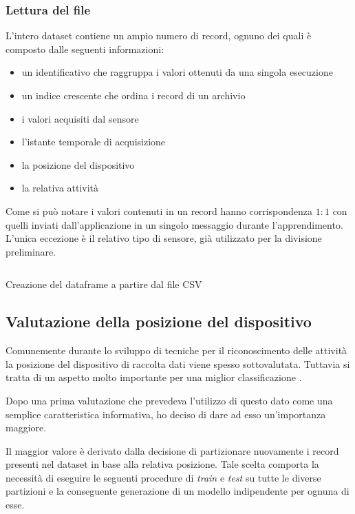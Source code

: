 \subsubsection{Lettura del file}
L'intero dataset contiene un ampio numero di record, ognuno dei quali è composto dalle seguenti informazioni:
\begin{itemize}
    \item un identificativo che raggruppa i valori ottenuti da una singola esecuzione
    \item un indice crescente che ordina i record di un archivio
    \item i valori acquisiti dal sensore
    \item l'istante temporale di acquisizione
    \item la posizione del dispositivo
    \item la relativa attività
\end{itemize}
Come si può notare i valori contenuti in un record hanno corrispondenza $1:1$ con quelli 
inviati dall'applicazione in un singolo messaggio durante l'apprendimento. L'unica eccezione è 
il relativo tipo di sensore, già utilizzato per la divisione preliminare.

\begin{listing}[H] 
    \inputminted[frame=single,framesep=10pt]{python}{assets/snippets/classifier/read_csv.py}
    \caption{Creazione del dataframe a partire dal file CSV}
\end{listing}


\subsection{Valutazione della posizione del dispositivo}
Comunemente durante lo sviluppo di tecniche per il riconoscimento delle attività la posizione del dispositivo di 
raccolta dati viene spesso sottovalutata. Tuttavia si tratta di un aspetto molto importante per 
una miglior classificazione \cite{umafall}.

\vspace{5mm} %

Dopo una prima valutazione che prevedeva l'utilizzo di questo dato come una semplice caratteristica informativa, ho deciso 
di dare ad esso un'importanza maggiore. 

Il maggior valore è derivato dalla decisione di partizionare nuovamente i record presenti nel dataset in base alla relativa posizione. 
Tale scelta comporta la necessità di eseguire le seguenti procedure di \textit{train} e \textit{test} su tutte 
le diverse partizioni e la conseguente generazione di un modello indipendente per ognuna di esse.

